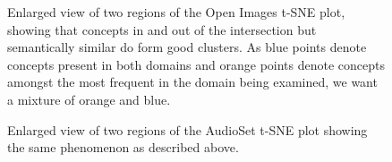 \begin{figure}[H]

    \centering
    \caption{\label{fig:openimageszoom}Enlarged view of two regions of the Open Images t-SNE plot, showing that concepts in and out of the intersection but semantically similar do form good clusters. As blue points denote concepts present in both domains and orange points denote concepts amongst the most frequent in the domain being examined, we want a mixture of orange and blue. }
\end{figure}

\begin{figure}[H]

    \centering
    \caption{\label{fig:audiosetzoom}Enlarged view of two regions of the AudioSet t-SNE plot showing the same phenomenon as described above.}
\end{figure}


